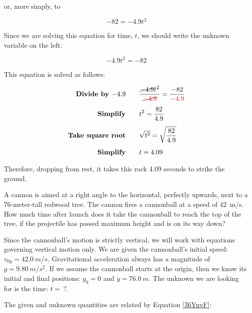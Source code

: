 \documentclass{article}
\begin{document}
or, more simply, to

\begin{equation*}
    -82 = - 4.9 t^2
\end{equation*}

Since we are solving this equation for time, $t$, we should write the unknown variable on the left:

\begin{equation*}
    -4.9 t^2 = -82
\end{equation*}

This equation is solved as follows:

\begin{align*}
    \textbf{Divide by $-4.9$} \qquad & \frac{\cancel{-4.9} t^2}{\cancel{\mathbin{\color{red} -} \textcolor{red}{4.9}}} = \frac{-82}{\mathbin{\color{red} -} \textcolor{red}{4.9}}\\[1ex]
    \textbf{Simplify} \qquad & t^2 = \frac{82}{4.9}\\[1ex]
    \textbf{Take square root} \qquad & \sqrt{t^2} = \sqrt{\frac{82}{4.9}}\\[1ex]
    \textbf{Simplify} \qquad & t = 4.09
\end{align*}

Therefore, dropping from rest, it takes this rock 4.09 seconds to strike the ground.

\endsolution


\begin{example} \label{lB7EDG}
    A cannon is aimed at a right angle to the horizontal, perfectly upwards, next to a 76-meter-tall redwood tree. The cannon fires a cannonball at a speed of \SI{42}{m/s}. How much time after launch does it take the cannonball to reach the top of the tree, if the projectile has passed maximum height and is on its way down?
\end{example}

\Solution Since the cannonball's motion is strictly vertical, we will work with equations governing vertical motion only. We are given the cannonball's initial speed: $v_{0y} = \SI{42.0}{m/s}$. Gravitational acceleration always has a magnitude of $g = \SI{9.80}{m/s^2}$. If we assume the cannonball starts at the origin, then we know its initial and final positions: $y_0 = 0$ and $y = \SI{76.0}{m}$. The unknown we are looking for is the time: $t =\ ?$.

\vspace{1em}

The given and unknown quantities are related by Equation \eqref{36YuvF}:
\end{document}
